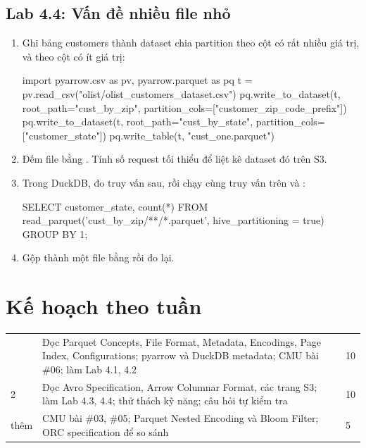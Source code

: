 \subsection{Lab 4.4: Vấn đề nhiều file nhỏ}
\begin{enumerate}
  \item Ghi bảng customers thành dataset chia partition theo cột có rất nhiều giá trị, và theo cột có ít giá trị:
\begin{codeblock}
import pyarrow.csv as pv, pyarrow.parquet as pq
t = pv.read_csv("olist/olist_customers_dataset.csv")
pq.write_to_dataset(t, root_path="cust_by_zip",   partition_cols=["customer_zip_code_prefix"])
pq.write_to_dataset(t, root_path="cust_by_state", partition_cols=["customer_state"])
pq.write_table(t, "cust_one.parquet")
\end{codeblock}
  \item Đếm file bằng . Tính số request  tối thiểu để liệt kê dataset đó trên S3.
  \item Trong DuckDB, đo truy vấn sau, rồi chạy cùng truy vấn trên  và :
\begin{codeblock}
SELECT customer_state, count(*)
FROM read_parquet('cust_by_zip/**/*.parquet', hive_partitioning = true)
GROUP BY 1;
\end{codeblock}
  \item Gộp  thành một file bằng  rồi đo lại.
\end{enumerate}

\section{Kế hoạch theo tuần}
\begin{xltabular}{\textwidth}{@{}P{1.4cm} L P{1.4cm}@{}}
\toprule
{} &  &  \\
\midrule
\endhead
\bottomrule
{} & Đọc Parquet Concepts, File Format, Metadata, Encodings, Page Index, Configurations; pyarrow và DuckDB metadata; CMU bài \#06; làm Lab 4.1, 4.2 & 10 \\
2 & Đọc Avro Specification, Arrow Columnar Format, các trang S3; làm Lab 4.3, 4.4; thử thách kỹ năng; câu hỏi tự kiểm tra & 10 \\
thêm & CMU bài \#03, \#05; Parquet Nested Encoding và Bloom Filter; ORC specification để so sánh & 5 \\
\end{xltabular}

